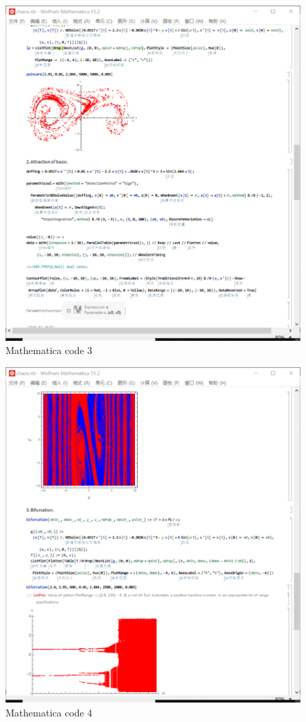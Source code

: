\documentclass{article}
\begin{document}
\begin{figure}
	\centering
	\includegraphics[width=0.6\linewidth]{plot/code3}
	\caption{Mathematica code 3}
	\label{fig:code3}
\end{figure}
\begin{figure}
	\centering
	\includegraphics[width=0.6\linewidth]{plot/code4}
	\caption{Mathematica code 4}
	\label{fig:code4}
\end{figure}
\end{document}
